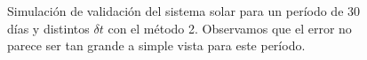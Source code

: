 \begin{figure}
{	\label{fig:ej2_m2_30_12}
	}
	\caption{
		Simulación de validación del sistema solar para un período de 30 días y distintos $\delta t$
		con el método 2.
		Observamos que el error no parece ser tan grande a simple vista para este período.
	}
	\label{ fig:res_ej2_m2_30 }
\end{figure}
